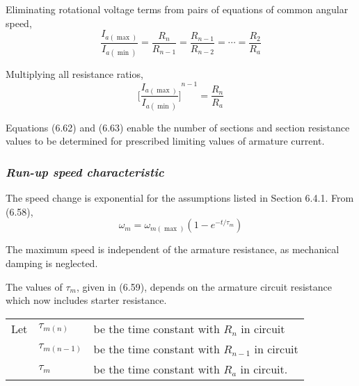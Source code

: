 \documentclass[a4paper,numbers=noenddot,12pt]{scrbook}
\begin{document}
Eliminating rotational voltage terms from pairs of equations of common angular speed,
\begin{equation}
    \dfrac{I_{a(\max)}}{I_{a(\min)}} = \dfrac{R_n}{R_{n-1}} = \dfrac{R_{n-1}}{R_{n-2}} = \cdots = \dfrac{R_2}{R_a}
    \label{}
\end{equation}

Multiplying all resistance ratios,
\begin{equation}
    {\bigg[\dfrac{I_{a(\max)}}{I_{a(\min)}}\bigg]}^{n - 1} = \dfrac{R_n}{R_a}
    \label{}
\end{equation}

Equations (6.62) and (6.63) enable the number of sections and section resistance values to be determined for prescribed limiting values of armature current.

\subsubsection{\textit{Run-up speed characteristic}} The speed change is exponential for the assumptions listed in Section 6.4.1.
From (6.58),
\begin{equation*}
    \omega_m = \omega_{m (\max)}(1 - e^{-t / \tau_m})
\end{equation*}

The maximum speed is independent of the armature resistance, as mechanical damping is neglected.

The values of $\tau_m$, given in (6.59), depends on the armature circuit resistance which now includes starter resistance. \par \smallskip
\begin{tabularx}{\textwidth}{l@{\enskip}ll}
    Let & $\tau_{m(n)}$ & be the time constant with $R_n$ in circuit \\
    & $\tau_{m(n-1)}$ & be the time constant with $R_{n-1}$ in circuit \\
    & $\tau_{m}$ & be the time constant with $R_{a}$ in circuit. \\
\end{tabularx}
\end{document}
